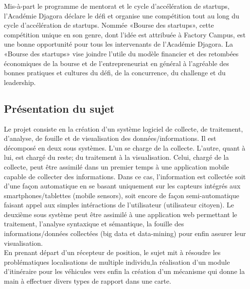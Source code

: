 
Mis-à-part le programme de mentorat et le cycle d’accélération de startups,
l'Académie Djagora déclare le défi et organise une compétition tout au long
du cycle d’accélération de startups. Nommée «Bourse des startups», cette
compétition unique en son genre, dont l'idée est attribuée à Factory Campus,
est une bonne opportunité pour tous les intervenants de l'Académie Djagora.
La «Bourse des startups» vise joindre l'utile du modèle financier et des retombées
économiques de la bourse et de l'entrepreneuriat en général à l'agréable des
bonnes pratiques et cultures du défi, de la concurrence, du challenge et du
leadership.

\subsection{Présentation du sujet}

 Le projet consiste en la création d'un système logiciel de collecte, 
 de traitement, d'analyse, de fouille et de visualisation des données/informations.
 Il est décomposé en deux sous systèmes. L'un se charge de la collecte. L'autre,
 quant à lui, est chargé du reste; du traitement à la visualisation. 
 Celui, chargé de la collecte, peut être assimilé dans un premier temps 
 à une application mobile capable de collecter des informations. Dans ce cas, 
 l'information est collectée soit d'une façon automatique en se basant uniquement 
 sur les capteurs intégrés aux smartphones/tablettes (mobile sensors), 
 soit encore de façon semi-automatique faisant appel aux simples intéractions 
 de l'utilisateur (utilisateur citoyen). Le deuxième sous système peut être 
 assimilé à une application web permettant le traitement, l'analyse syntaxique
 et sémantique, la fouille des informations/données collectées (big data et
 data-mining) pour enfin assurer leur visualisation. \\
En prenant départ d'un récepteur de position, le sujet mit à résoudre les
problématiques localisations de multiple individu,la réalisation d'un module
d'itinéraire pour les véhicules vers enfin la création d'un mécanisme qui donne
la main à effectuer divers types de rapport dans une carte.


